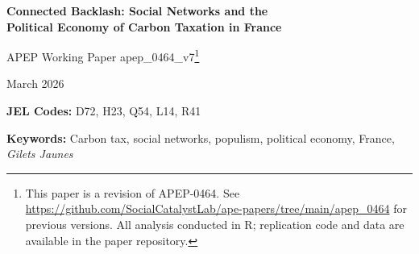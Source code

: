 \documentclass[12pt]{article}
\newcommand{\rn}{Rassemblement National}
\newcommand{\dept}{d\'{e}partement}
\newcommand{\depts}{d\'{e}partements}
\begin{document}

\begin{titlepage}
\begin{center}
\vspace*{1cm}

{\LARGE\bfseries Connected Backlash: Social Networks and the\\
Political Economy of Carbon Taxation in France}

\vspace{1cm}

{\large APEP Working Paper apep\_0464\_v7\footnote{This paper is a revision of APEP-0464. See \url{https://github.com/SocialCatalystLab/ape-papers/tree/main/apep_0464} for previous versions. All analysis conducted in R; replication code and data are available in the paper repository.}}

\vspace{0.5cm}

{\large March 2026}

\vspace{1cm}

\begin{abstract}
\noindent Why did the political backlash against France's carbon tax spread far beyond the communities it hit hardest? Using Facebook's Social Connectedness Index across 96 \depts{} and ten elections (2002--2024), I show that social-network exposure to fuel-vulnerable areas raised \rn{} vote share by 1.35 percentage points per standard deviation (SE~=~0.46) in the primary \dept{}-level specification. Event-study estimates reveal a discrete break at the 2014 tax introduction with no positive pre-trends; a \citet{rambachan2023more} sensitivity analysis bounds the effect at [0.40, 2.21]. Descriptively, both fuel-vulnerability and immigration-related network exposures predict \rn{} gains, consistent with social ties transmitting bundled populist cues rather than a single policy grievance. The effect scales with the tax rate, persists through five post-treatment elections, and is absent for Green and center-right parties.
\end{abstract}

\vspace{0.3cm}

\textbf{JEL Codes:} D72, H23, Q54, L14, R41

\textbf{Keywords:} Carbon tax, social networks, populism, political economy, France, \textit{Gilets Jaunes}

\end{center}
\end{titlepage}
\end{document}
